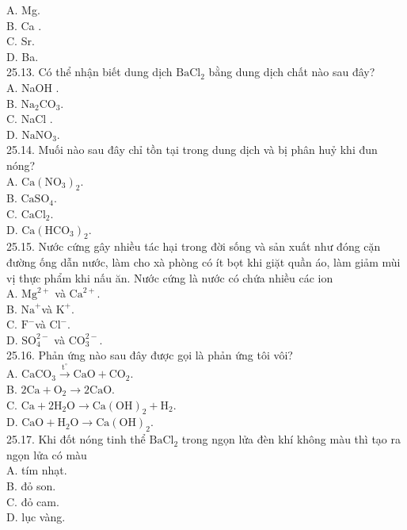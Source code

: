 \documentclass[10pt]{article}
\begin{document}
A. Mg.\\
B. Ca .\\
C. Sr.\\
D. Ba.\\
25.13. Có thể nhận biết dung dịch $\mathrm{BaCl}_{2}$ bằng dung dịch chất nào sau đây?\\
A. NaOH .\\
B. $\mathrm{Na}_{2} \mathrm{CO}_{3}$.\\
C. NaCl .\\
D. $\mathrm{NaNO}_{3}$.\\
25.14. Muối nào sau đây chỉ tồn tại trong dung dịch và bị phân huỷ khi đun nóng?\\
A. $\mathrm{Ca}\left(\mathrm{NO}_{3}\right)_{2}$.\\
B. $\mathrm{CaSO}_{4}$.\\
C. $\mathrm{CaCl}_{2}$.\\
D. $\mathrm{Ca}\left(\mathrm{HCO}_{3}\right)_{2}$.\\
25.15. Nước cứng gây nhiều tác hại trong đời sống và sản xuất như đóng cặn đường ống dẫn nước, làm cho xà phòng có ít bọt khi giặt quần áo, làm giảm mùi vị thực phẩm khi nấu ăn. Nước cứng là nước có chứa nhiều các ion\\
A. $\mathrm{Mg}^{2+}$ và $\mathrm{Ca}^{2+}$.\\
B. $\mathrm{Na}^{+}$và $\mathrm{K}^{+}$.\\
C. $\mathrm{F}^{-}$và $\mathrm{Cl}^{-}$.\\
D. $\mathrm{SO}_{4}^{2-}$ và $\mathrm{CO}_{3}^{2-}$.\\
25.16. Phản ứng nào sau đây được gọi là phản ứng tôi vôi?\\
A. $\mathrm{CaCO}_{3} \xrightarrow{\mathrm{t}^{\circ}} \mathrm{CaO}+\mathrm{CO}_{2}$.\\
B. $2 \mathrm{Ca}+\mathrm{O}_{2} \longrightarrow 2 \mathrm{CaO}$.\\
C. $\mathrm{Ca}+2 \mathrm{H}_{2} \mathrm{O} \longrightarrow \mathrm{Ca}(\mathrm{OH})_{2}+\mathrm{H}_{2}$.\\
D. $\mathrm{CaO}+\mathrm{H}_{2} \mathrm{O} \longrightarrow \mathrm{Ca}(\mathrm{OH})_{2}$.\\
25.17. Khi đốt nóng tinh thể $\mathrm{BaCl}_{2}$ trong ngọn lửa đèn khí không màu thì tạo ra ngọn lửa có màu\\
A. tím nhạt.\\
B. đỏ son.\\
C. đỏ cam.\\
D. lục vàng.\\
\end{document}
